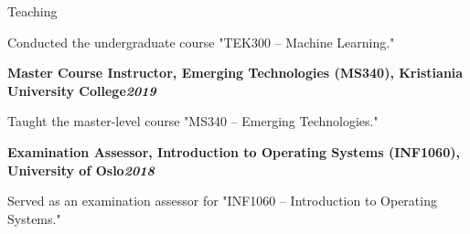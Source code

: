 \begin{rubric}{Teaching}
\begin{compactitem}
    \item Conducted the undergraduate course "TEK300 – Machine Learning."
    \vspace{-12pt}
\end{compactitem}
%
\entry*[]%
\textbf{Master Course Instructor, Emerging Technologies (MS340), Kristiania University College\hfill\textit{2019}} \par
\begin{compactitem}
    \item Taught the master-level course "MS340 – Emerging Technologies."
    \vspace{-12pt}
\end{compactitem}
%
\entry*[]%
\textbf{Examination Assessor, Introduction to Operating Systems (INF1060), University of Oslo\hfill\textit{2018}} \par
\begin{compactitem}
    \item Served as an examination assessor for "INF1060 – Introduction to Operating Systems."
    \vspace{-12pt}
\end{compactitem}
\end{rubric}